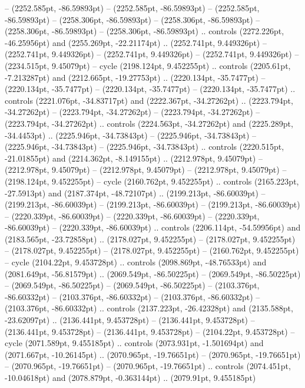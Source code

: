  -- (2252.585pt, -86.59893pt)
 -- (2252.585pt, -86.59893pt)
 -- (2252.585pt, -86.59893pt)
 -- (2258.306pt, -86.59893pt)
 -- (2258.306pt, -86.59893pt)
 -- (2258.306pt, -86.59893pt)
 -- (2258.306pt, -86.59893pt) .. controls (2272.226pt, -46.25956pt) and (2255.269pt, -22.21174pt) .. (2252.741pt, 9.449326pt)
 -- (2252.741pt, 9.449326pt)
 -- (2252.741pt, 9.449326pt)
 -- (2252.741pt, 9.449326pt)
 -- (2234.515pt, 9.45079pt) -- cycle
(2198.124pt, 9.452255pt) .. controls (2205.61pt, -7.213287pt) and (2212.665pt, -19.27753pt) .. (2220.134pt, -35.7477pt)
 -- (2220.134pt, -35.7477pt)
 -- (2220.134pt, -35.7477pt)
 -- (2220.134pt, -35.7477pt) .. controls (2221.076pt, -34.83717pt) and (2222.367pt, -34.27262pt) .. (2223.794pt, -34.27262pt)
 -- (2223.794pt, -34.27262pt)
 -- (2223.794pt, -34.27262pt)
 -- (2223.794pt, -34.27262pt) .. controls (2224.563pt, -34.27262pt) and (2225.289pt, -34.4453pt) .. (2225.946pt, -34.73843pt)
 -- (2225.946pt, -34.73843pt)
 -- (2225.946pt, -34.73843pt)
 -- (2225.946pt, -34.73843pt) .. controls (2220.515pt, -21.01855pt) and (2214.362pt, -8.149155pt) .. (2212.978pt, 9.45079pt)
 -- (2212.978pt, 9.45079pt)
 -- (2212.978pt, 9.45079pt)
 -- (2212.978pt, 9.45079pt)
 -- (2198.124pt, 9.452255pt) -- cycle
(2160.762pt, 9.452255pt) .. controls (2165.223pt, -27.5913pt) and (2187.374pt, -48.72107pt) .. (2199.213pt, -86.60039pt)
 -- (2199.213pt, -86.60039pt)
 -- (2199.213pt, -86.60039pt)
 -- (2199.213pt, -86.60039pt)
 -- (2220.339pt, -86.60039pt)
 -- (2220.339pt, -86.60039pt)
 -- (2220.339pt, -86.60039pt)
 -- (2220.339pt, -86.60039pt) .. controls (2206.114pt, -54.59956pt) and (2183.565pt, -23.72858pt) .. (2178.027pt, 9.452255pt)
 -- (2178.027pt, 9.452255pt)
 -- (2178.027pt, 9.452255pt)
 -- (2178.027pt, 9.452255pt)
 -- (2160.762pt, 9.452255pt) -- cycle
(2104.22pt, 9.453728pt) .. controls (2098.869pt, -48.76533pt) and (2081.649pt, -56.81579pt) .. (2069.549pt, -86.50225pt)
 -- (2069.549pt, -86.50225pt)
 -- (2069.549pt, -86.50225pt)
 -- (2069.549pt, -86.50225pt)
 -- (2103.376pt, -86.60332pt)
 -- (2103.376pt, -86.60332pt)
 -- (2103.376pt, -86.60332pt)
 -- (2103.376pt, -86.60332pt) .. controls (2137.223pt, -26.42328pt) and (2135.588pt, -23.62097pt) .. (2136.441pt, 9.453728pt)
 -- (2136.441pt, 9.453728pt)
 -- (2136.441pt, 9.453728pt)
 -- (2136.441pt, 9.453728pt)
 -- (2104.22pt, 9.453728pt) -- cycle
(2071.589pt, 9.455185pt) .. controls (2073.931pt, -1.501694pt) and (2071.667pt, -10.26145pt) .. (2070.965pt, -19.76651pt)
 -- (2070.965pt, -19.76651pt)
 -- (2070.965pt, -19.76651pt)
 -- (2070.965pt, -19.76651pt) .. controls (2074.451pt, -10.04618pt) and (2078.879pt, -0.363144pt) .. (2079.91pt, 9.455185pt)
